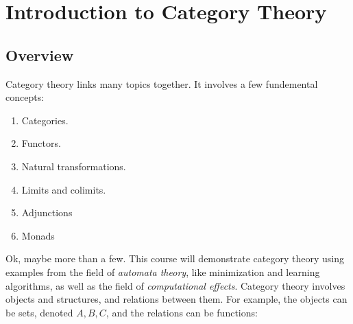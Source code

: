 \section{Introduction to Category Theory}
\subsection{Overview}
Category theory links many topics together. It involves a few fundemental concepts:
\begin{enumerate}
\item Categories.
\item Functors.
\item Natural transformations.
\item Limits and colimits.
\item Adjunctions
\item Monads
\end{enumerate}
Ok, maybe more than a few. This course will demonstrate category theory using examples from
the field of \emph{automata theory}, like minimization and learning algorithms, as well
as the field of \emph{computational effects}. Category theory involves objects and structures,
and relations between them. 
For example, the objects can be sets, denoted $A, B, C$, and the relations can be functions:
\begin{figure}
\end{figure}

